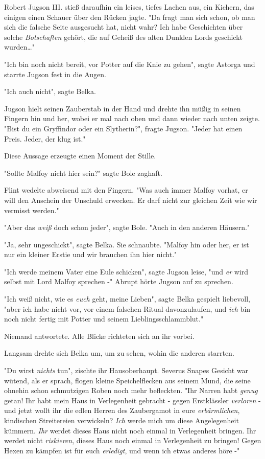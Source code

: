 {Robert Jugson III. stieß daraufhin ein leises, tiefes Lachen aus, ein Kichern, das einigen einen Schauer über den Rücken jagte. "Da fragt man sich schon, ob man sich die falsche Seite ausgesucht hat, nicht wahr? Ich habe Geschichten über solche \emph{Botschaften} gehört, die auf Geheiß des alten Dunklen Lords geschickt wurden…"

"Ich bin noch nicht bereit, vor Potter auf die Knie zu gehen", sagte Astorga und starrte Jugson fest in die Augen.

"Ich auch nicht", sagte Belka.

Jugson hielt seinen Zauberstab in der Hand und drehte ihn müßig in seinen Fingern hin und her, wobei er mal nach oben und dann wieder nach unten zeigte. "Bist du ein Gryffindor oder ein Slytherin?", fragte Jugson. "Jeder hat einen Preis. Jeder, der klug ist."

Diese Aussage erzeugte einen Moment der Stille.

"Sollte Malfoy nicht hier sein?" sagte Bole zaghaft.

Flint wedelte abweisend mit den Fingern. "Was auch immer Malfoy vorhat, er will den Anschein der Unschuld erwecken. Er darf nicht zur gleichen Zeit wie wir vermisst werden."

"Aber das \emph{weiß} doch schon jeder", sagte Bole. "Auch in den anderen Häusern."

"Ja, sehr ungeschickt", sagte Belka. Sie schnaubte. "Malfoy hin oder her, er ist nur ein kleiner Erstie und wir brauchen ihn hier nicht."

"Ich werde meinem Vater eine Eule schicken", sagte Jugson leise, "und \emph{er} wird selbst mit Lord Malfoy sprechen -" Abrupt hörte Jugson auf zu sprechen.

"Ich weiß nicht, wie es \emph{euch} geht, meine Lieben", sagte Belka gespielt liebevoll, "aber ich habe nicht vor, vor einem falschen Ritual davonzulaufen, und \emph{ich} bin noch nicht fertig mit Potter und seinem Lieblingsschlammblut."

Niemand antwortete. Alle Blicke richteten sich an ihr vorbei.

Langsam drehte sich Belka um, um zu sehen, wohin die anderen starrten.

"Du wirst \emph{nichts} tun", zischte ihr Hausoberhaupt. Severus Snapes Gesicht war wütend, als er sprach, flogen kleine Speichelflecken aus seinem Mund, die seine ohnehin schon schmutzigen Roben noch mehr befleckten. "Ihr Narren habt \emph{genug} getan! Ihr habt mein Haus in Verlegenheit gebracht - gegen Erstklässler \emph{verloren} - und jetzt wollt ihr die edlen Herren des Zaubergamot in eure \emph{erbärmlichen}, kindischen Streitereien verwickeln? \emph{Ich} werde mich um diese Angelegenheit kümmern. \emph{Ihr} werdet dieses Haus nicht noch einmal in Verlegenheit bringen. Ihr werdet nicht \emph{riskieren}, dieses Haus noch einmal in Verlegenheit zu bringen! Gegen Hexen zu kämpfen ist für euch \emph{erledigt}, und wenn ich etwas anderes höre -"

}
